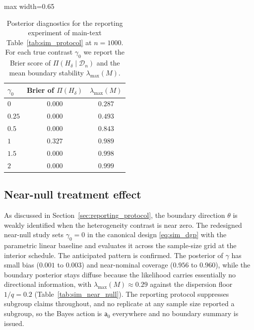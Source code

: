 \documentclass[11pt]{article}
\theoremstyle{definition}
\theoremstyle{plain}
\begin{document}
\begin{table}[!htbp]
  \centering
  \caption{Posterior diagnostics for the reporting experiment of main-text Table~\ref{tab:sim_protocol} at $n=1000$. For each true contrast $\gamma_0$ we report the Brier score of $\Pi(H_\delta\mid\mathcal D_n)$ and the mean boundary stability $\lambda_{\max}(M)$.}
  \label{tab:protocol_ope_char}
  \begin{adjustbox}{max width=0.65\textwidth}
  \begin{tabular}{lcc}
    \toprule
    $\gamma_0$ & Brier of $\Pi(H_\delta)$ & $\lambda_{\max}(M)$\\
    \midrule
    $0$    & $0.000$ & $0.287$\\
    $0.25$ & $0.000$ & $0.493$\\
    $0.5$  & $0.000$ & $0.843$\\
    $1$    & $0.327$ & $0.989$\\
    $1.5$  & $0.000$ & $0.998$\\
    $2$    & $0.000$ & $0.999$\\
    \bottomrule
  \end{tabular}
  \end{adjustbox}
\end{table}


\subsection{Near-null treatment effect}
\label{sec:simulation_under_null}

As discussed in Section~\ref{sec:reporting_protocol}, the boundary direction $\theta$ is weakly identified when the heterogeneity contrast is near zero. The redesigned near-null study sets $\gamma_0=0$ in the canonical design \eqref{eq:sim_dgp} with the parametric linear baseline and evaluates it across the sample-size grid at the interior schedule. The anticipated pattern is confirmed. The posterior of $\gamma$ has small bias ($0.001$ to $0.003$) and near-nominal coverage ($0.956$ to $0.960$), while the boundary posterior stays diffuse because the likelihood carries essentially no directional information, with $\lambda_{\max}(M)\approx0.29$ against the dispersion floor $1/q=0.2$ (Table~\ref{tab:sim_near_null}). The reporting protocol suppresses subgroup claims throughout, and no replicate at any sample size reported a subgroup, so the Bayes action is $\mathsf a_0$ everywhere and no boundary summary is issued.
\end{document}
